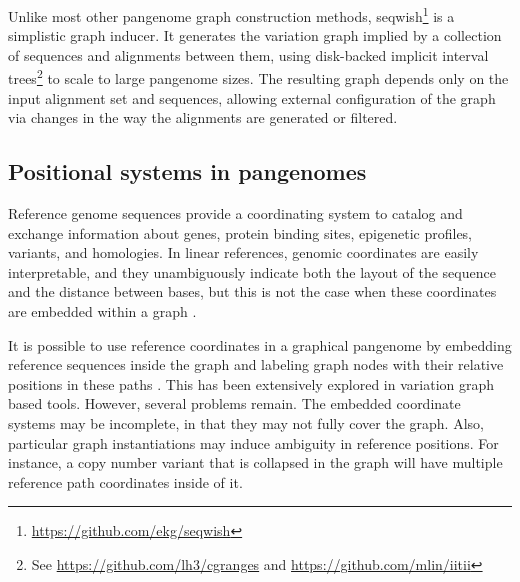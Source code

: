 Unlike most other pangenome graph construction methods, seqwish\footnote{\url{https://github.com/ekg/seqwish}} \cite{Garrison_2019} is a simplistic graph inducer.
It generates the variation graph implied by a collection of sequences and alignments between them, using disk-backed implicit interval trees\footnote{See \url{https://github.com/lh3/cgranges} and \url{https://github.com/mlin/iitii}} to scale to large pangenome sizes.
The resulting graph depends only on the input alignment set and sequences, allowing external configuration of the graph via changes in the way the alignments are generated or filtered.








\subsection{Positional systems in pangenomes}

Reference genome sequences provide a coordinating system to catalog and exchange information about genes, protein binding sites, epigenetic profiles, variants, and homologies.
In linear references, genomic coordinates are easily interpretable, and they unambiguously indicate both the layout of the sequence and the distance between bases, but this is not the case when these coordinates are embedded within a graph \cite{Rand_2017}.

It is possible to use reference coordinates in a graphical pangenome by embedding reference sequences inside the graph and labeling graph nodes with their relative positions in these paths \cite{Garrison_2018,Garrison_2019}.
This has been extensively explored in variation graph based tools.
However, several problems remain.
The embedded coordinate systems may be incomplete, in that they may not fully cover the graph.
Also, particular graph instantiations may induce ambiguity in reference positions.
For instance, a copy number variant that is collapsed in the graph will have multiple reference path coordinates inside of it.

